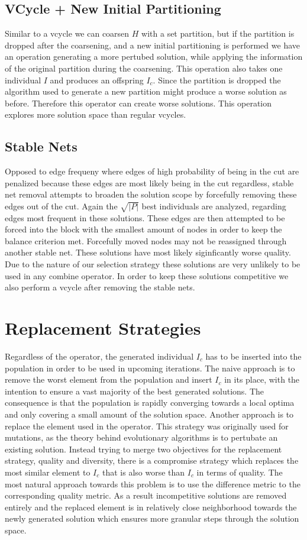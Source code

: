 \documentclass[a4paper,12pt,bibtotoc,titlepage, liststotoc,BCOR7mm,headsepline,pointlessnumbers]{scrbook}
\numberwithin{equation}{section}
\begin{document}
\subsection{VCycle + New Initial Partitioning}
Similar to a vcycle we can coarsen $H$ with a set partition, but if the partition is dropped after the coarsening, and a new initial partitioning is performed we have an operation generating a more pertubed solution, while applying the information of the original partition during the coarsening. This operation also takes one individual $I$ and produces an offspring $I_c$. Since the partition is
dropped the algorithm used to generate a new partition might produce a worse solution as before. Therefore this operator can create worse solutions. This operation explores more solution space than regular vcycles.  
\subsection{Stable Nets}
Opposed to edge frequeny where edges of high probability of being in the cut are penalized because these edges are most likely being in the cut regardless, stable net removal attempts to broaden the solution scope by forcefully removing these edges out of the cut. Again the $\sqrt{|P|}$ best individuals are analyzed, regarding edges most frequent in these solutions. These edges are then attempted to be forced into the block with the smallest amount of nodes in order to keep the balance criterion met. Forcefully moved nodes may not be reassigned through another stable net. These solutions have most likely siginficantly worse quality. Due to the nature of our selection strategy these solutions are very unlikely to be used in any combine operator. In order to keep these solutions competitive we also perform a vcycle after removing the stable nets. 
\section{Replacement Strategies}
Regardless of the operator, the generated individual $I_c$ has to be inserted into the population in order to be used in upcoming iterations. 
The naive approach is to remove the worst element from the population and insert $I_c$ in its place, with the intention to ensure a vast majority of the best generated solutions. The consequence is that the population is rapidly converging towards a local optima and only covering a small amount of the solution space. Another approach is to replace the element used in the operator. This strategy was originally used for mutations, as the theory behind evolutionary algorithms is to pertubate an existing solution. Instead trying to merge two objectives for the replacement strategy, quality and diversity, there is a compromise strategy which replaces the most similar element to $I_c$ that is also worse than $I_c$ in terms of quality. The most natural approach towards this problem is to use the difference metric to the corresponding quality metric. As a result incompetitive solutions are removed entirely and the replaced element is in relatively close neighborhood towards the newly generated solution which ensures more granular steps through the solution space. 
\end{document}
